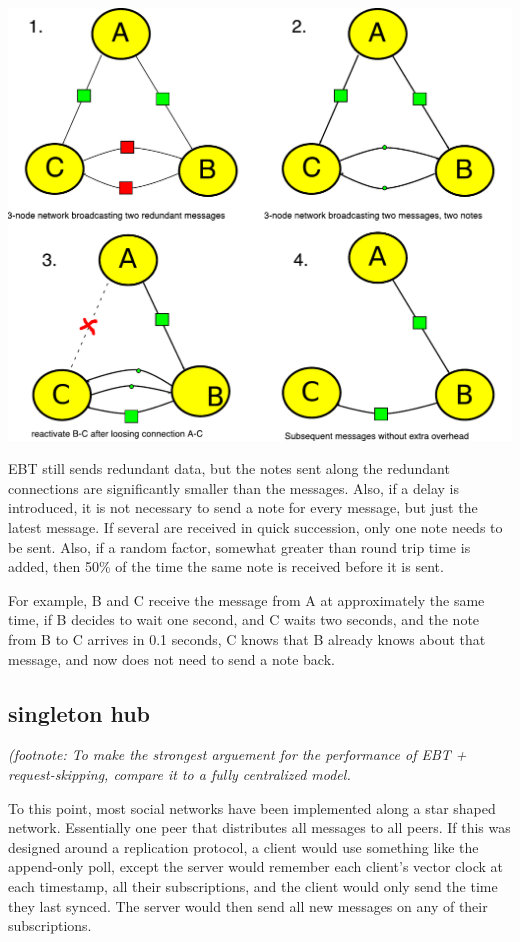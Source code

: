 \documentclass[sigconf]{acmart}
\begin{document}
\includegraphics[width=0.9\columnwidth]{figs/redundant.pdf}

EBT still sends redundant data, but the notes sent along the redundant
connections are significantly smaller than the messages. Also, if a
delay is introduced, it is not necessary to send a note for every
message, but just the latest message.  If several are received in
quick succession, only one note needs to be sent.  Also, if a random
factor, somewhat greater than round trip time is added, then 50\% of
the time the same note is received before it is sent.

For example, B and C receive the message from A at approximately the
same time, if B decides to wait one second, and C waits two seconds,
and the note from B to C arrives in 0.1 seconds, C knows that B
already knows about that message, and now does not need to send a note
back.

\subsection{singleton hub}

{\em (footnote: To make the strongest arguement for the performance of
  EBT + request-skipping, compare it to a fully centralized model.}

To this point, most social networks have been implemented along a star
shaped network. Essentially one peer that distributes all messages to
all peers. If this was designed around a replication protocol, a
client would use something like the append-only poll, except the
server would remember each client's vector clock at each timestamp,
all their subscriptions, and the client would only send the time they
last synced.  The server would then send all new messages on any of
their subscriptions.
\end{document}
